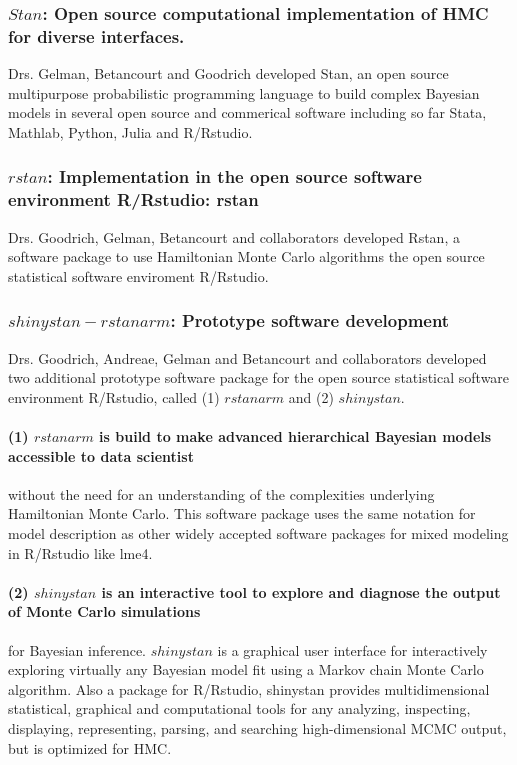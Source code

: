 \documentclass[11pt,notitlepage]{article}
\begin{document}
\subsubsection*{$Stan$: Open source computational implementation of HMC for diverse interfaces.} Drs. Gelman, Betancourt and Goodrich developed Stan, an open source multipurpose probabilistic programming language to build complex Bayesian models in several open source and commerical software including so far Stata, Mathlab, Python, Julia and R/Rstudio. 
 
\subsubsection*{$rstan$: Implementation in the open source software environment R/Rstudio: rstan} Drs. Goodrich, Gelman, Betancourt and collaborators developed Rstan, a software package to use Hamiltonian Monte Carlo algorithms the open source statistical software enviroment R/Rstudio.
\subsubsection*{$shinystan - rstanarm$: Prototype software development} Drs. Goodrich, Andreae, Gelman and Betancourt and collaborators developed two additional prototype software package for the open source statistical software environment R/Rstudio, called (1) $rstanarm$ and (2) $shinystan$.

\paragraph*{(1) $rstanarm$ is build to make advanced hierarchical Bayesian models accessible to data scientist} without the need for an understanding of the complexities underlying Hamiltonian Monte Carlo. This software package uses the same notation for model description as other widely accepted software packages for mixed modeling in R/Rstudio like lme4. 

\paragraph*{(2) $shinystan$ is an interactive tool to explore and diagnose the output of Monte Carlo simulations}for Bayesian inference.  $shinystan$ is a graphical user interface for interactively exploring virtually any Bayesian model fit using a Markov chain Monte Carlo algorithm. Also a package for R/Rstudio, shinystan  provides multidimensional statistical, graphical and computational tools for any analyzing, inspecting, displaying, representing, parsing, and searching high-dimensional MCMC output, but is optimized for HMC. 
\end{document}
